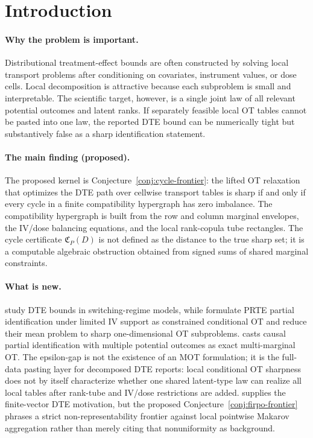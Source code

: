 \documentclass[11pt]{article}
\theoremstyle{definition}
\theoremstyle{plain}
\theoremstyle{remark}
\begin{document}
\section{Introduction}
\paragraph{Why the problem is important.}
Distributional treatment-effect bounds are often constructed by solving local
transport problems after conditioning on covariates, instrument values, or dose
cells.  Local decomposition is attractive because each subproblem is small and
interpretable.  The scientific target, however, is a single joint law of all
relevant potential outcomes and latent ranks.  If separately feasible local OT
tables cannot be pasted into one law, the reported DTE bound can be numerically
tight but substantively false as a sharp identification statement.

\paragraph{The main finding (proposed).}
The proposed kernel is Conjecture~\ref{conj:cycle-frontier}: the lifted OT
relaxation that optimizes the DTE path over cellwise transport tables is sharp if
and only if every cycle in a finite compatibility hypergraph has zero imbalance.
The compatibility hypergraph is built from the row and column marginal envelopes,
the IV/dose balancing equations, and the local rank-copula tube rectangles.  The
cycle certificate \(\mathfrak C_P(D)\) is not defined as the distance to the true
sharp set; it is a computable algebraic obstruction obtained from signed sums of
shared marginal constraints.

\paragraph{What is new.}
\citet[Sections 2--3]{FanWu2010} study DTE bounds in switching-regime models,
while \citet[Sections 2--3]{TanBlanchetSyrgkanis2026} formulate PRTE partial
identification under limited IV support as constrained conditional OT and reduce
their mean problem to sharp one-dimensional OT subproblems.  \citet[Section
2]{GaoGeQian2025} casts causal partial identification with multiple potential
outcomes as exact multi-marginal OT.  The epsilon-gap is not the existence of an
MOT formulation; it is the full-data pasting layer for decomposed DTE reports:
local conditional OT sharpness does not by itself characterize whether one
shared latent-type law can realize all local tables after rank-tube and IV/dose
restrictions are added.  \citet[Section 2]{FirpoRidder2019} supplies the
finite-vector DTE motivation, but the proposed Conjecture~\ref{conj:firpo-frontier}
phrases a strict non-representability frontier against local pointwise Makarov
aggregation rather than merely citing that nonuniformity as background.
\end{document}
